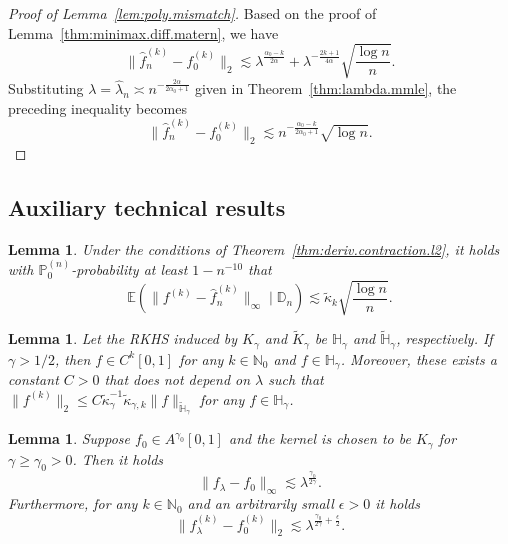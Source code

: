 \documentclass[12pt]{article}
\newcommand\data{\mathbb{D}_n}
\newcommand{\EE}{\mathbb{E}}
\newcommand{\PP}{\mathbb{P}}
\newcommand{\bbH}{\mathbb{H}}
\theoremstyle{plain}
\newtheorem{lemma}[theorem]{Lemma}
\theoremstyle{nonitalicremark}
\begin{document}
\begin{appendices}
\begin{proof}[Proof of Lemma~\ref{lem:poly.mismatch}]
Based on the proof of Lemma~\ref{thm:minimax.diff.matern}, we have
\begin{equation}
\|\hat f_n^{(k)} - f_0^{(k)}\|_2 \lesssim \lambda^{\frac{\alpha_0-k}{2\alpha}} + \lambda^{-\frac{2k+1}{4\alpha}} \sqrt{\frac{\log n}{n}}.
\end{equation}
Substituting $\lambda = \hat \lambda_n \asymp n^{-\frac{2\alpha}{2\alpha_0+1}}$ given in Theorem~\ref{thm:lambda.mmle}, the preceding inequality becomes
\begin{equation}
\|\hat f_n^{(k)} - f_0^{(k)}\|_2 \lesssim n^{-\frac{\alpha_0-k}{2\alpha_0+1}} \sqrt{\log n}.
\end{equation}
\end{proof}


\subsection{Auxiliary technical results}

\begin{lemma}\label{lem:entropy.integral.deriv}
Under the conditions of Theorem~\ref{thm:deriv.contraction.l2}, it holds with $\PP_0^{(n)}$-probability at least $1 - n^{-10}$ that
\begin{equation}
\EE\left(\|f^{(k)}-\hat{f}^{(k)}_n\|_\infty \mid \data\right) \lesssim \tilde{\kappa}_{k}\sqrt{\frac{\log n}{n}}.
\end{equation}
\end{lemma}


\begin{lemma}\label{lem:exp.RKHS.derivative}
Let the RKHS induced by $K_\gamma$ and $\tilde{K}_\gamma$ be $\bbH_\gamma$ and $\tilde{\bbH}_\gamma$, respectively. If $\gamma>1/2$, then $f\in C^k[0,1]$ for any $k\in\mathbb{N}_0$ and $f\in\bbH_\gamma$. Moreover, these exists a constant $C>0$ that does not depend on $\lambda$ such that $\|f^{(k)}\|_2\leq C\tilde{\kappa}_\gamma^{-1}\tilde{\kappa}_{\gamma,k}\|f\|_{\tilde{\bbH}_\gamma}$ for any $f\in\bbH_\gamma$.
\end{lemma}


\begin{lemma}\label{lem:exp.mismatch.deterministic}
Suppose $f_0\in A^{\gamma_0}[0,1]$ and the kernel is chosen to be $K_\gamma$ for $\gamma \geq \gamma_0 > 0$. Then it holds
\begin{equation}
\|f_\lambda - f_0\|_\infty \lesssim \lambda^{\frac{\gamma_0}{2\gamma}}.
\end{equation}
Furthermore, for any $k\in\mathbb{N}_0$ and an arbitrarily small $\epsilon>0$ it holds
\begin{equation}
\|f_\lambda^{(k)}-f_0^{(k)}\|_2 \lesssim \lambda^{\frac{\gamma_0}{2\gamma} + \frac{\epsilon}{2}}.
\end{equation}
\end{lemma}



\end{appendices}
\end{document}
